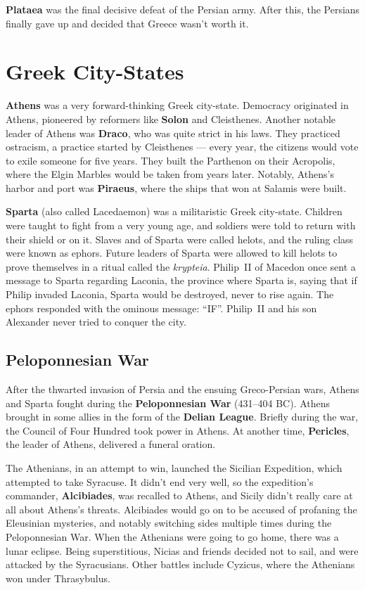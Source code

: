 \textbf{Plataea} was the final decisive defeat of the Persian army.
After this, the Persians finally gave up and decided that Greece wasn't worth it.

\section{Greek City-States}

\textbf{Athens} was a very forward-thinking Greek city-state.
Democracy originated in Athens, pioneered by reformers like \textbf{Solon} and Cleisthenes.
Another notable leader of Athens was \textbf{Draco}, who was quite strict in his laws.
They practiced ostracism, a practice started by Cleisthenes ---
every year, the citizens would vote to exile someone for five years.
They built the Parthenon on their Acropolis, where the Elgin Marbles would be taken from years later.
Notably, Athens's harbor and port was \textbf{Piraeus}, where the ships that won at Salamis were built.

\textbf{Sparta} (also called Lacedaemon) was a militaristic Greek city-state.
Children were taught to fight from a very young age,
and soldiers were told to return with their shield or on it.
Slaves and of Sparta were called helots, and the ruling class were known as ephors.
Future leaders of Sparta were allowed to kill helots
to prove themselves in a ritual called the \textit{krypteia}.
Philip~II of Macedon once sent a message to Sparta regarding Laconia, the province where Sparta is,
saying that if Philip invaded Laconia, Sparta would be destroyed, never to rise again.
The ephors responded with the ominous message: ``IF''.
Philip~II and his son Alexander never tried to conquer the city.

\subsection*{Peloponnesian War}

After the thwarted invasion of Persia and the ensuing Greco-Persian wars,
Athens and Sparta fought during the \textbf{Peloponnesian War} (431--404 BC).
Athens brought in some allies in the form of the \textbf{Delian League}.
Briefly during the war, the Council of Four Hundred took power in Athens.
At another time, \textbf{Pericles}, the leader of Athens, delivered a funeral oration.

The Athenians, in an attempt to win, launched the Sicilian Expedition,
which attempted to take Syracuse.
It didn't end very well,
so the expedition's commander, \textbf{Alcibiades}, was recalled to Athens,
and Sicily didn't really care at all about Athens's threats.
Alcibiades would go on to be accused of profaning the Eleusinian mysteries,
and notably switching sides multiple times during the Peloponnesian War.
When the Athenians were going to go home, there was a lunar eclipse.
Being superstitious, Nicias and friends decided not to sail, and were attacked by the Syracusians.
Other battles include Cyzicus, where the Athenians won under Thrasybulus.


